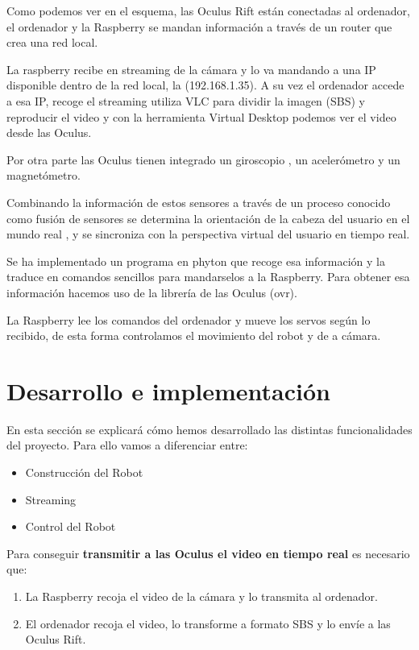 \documentclass[twoside, 12pt]{epstfg}
\begin{document}
Como podemos ver en el esquema, las Oculus Rift están conectadas al ordenador, el ordenador y la Raspberry se mandan información a través de un router que crea una red local.

La raspberry recibe en streaming de la cámara y lo va mandando a una IP disponible dentro de la red local, la (192.168.1.35). A su vez el ordenador accede a esa IP, recoge el streaming utiliza VLC para dividir la imagen (SBS) y reproducir el video y con la herramienta Virtual Desktop podemos ver el video desde las Oculus.

Por otra parte las Oculus tienen integrado un giroscopio , un acelerómetro y un magnetómetro.

Combinando la información de estos sensores a través de un proceso conocido como fusión de sensores se determina la orientación de la cabeza del usuario en el mundo real , y se sincroniza con la perspectiva virtual del usuario en tiempo real. 

Se ha implementado un programa en phyton que recoge esa información y la traduce en comandos sencillos para mandarselos a la Raspberry. Para obtener esa información hacemos uso de la librería de las Oculus (ovr).

La Raspberry lee los comandos del ordenador y mueve los servos según lo recibido, de esta forma controlamos el movimiento del robot y de a cámara.

\newpage
\section{Desarrollo e implementación}
En esta sección se explicará cómo hemos desarrollado las distintas funcionalidades del proyecto.
Para ello vamos a diferenciar entre:

\begin{itemize}
	\item Construcción del Robot
	\item Streaming 
	\item Control del Robot
\end{itemize}

Para conseguir \textbf{transmitir a las Oculus el video en tiempo real} es necesario que:
\begin{enumerate}
	\item La Raspberry recoja el video de la cámara y lo transmita al ordenador.
	
	\item El ordenador recoja el video, lo transforme a formato SBS y lo envíe a las Oculus Rift. 
	
\end{enumerate}
\end{document}
